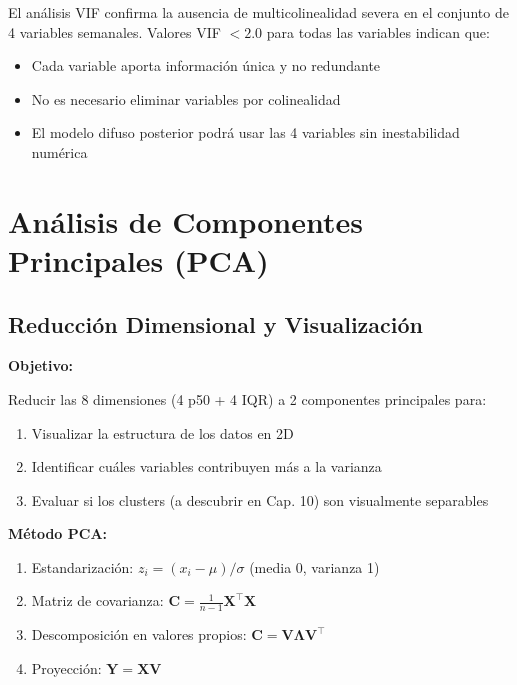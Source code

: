 \documentclass[12pt,letterpaper,twoside]{report}
\newcommand{\mat}[1]{\mathbf{#1}}
\begin{document}
\begin{calculobox}
\begin{conclusionbox}
El análisis VIF confirma la ausencia de multicolinealidad severa en el conjunto de 4 variables semanales. Valores VIF $< 2.0$ para todas las variables indican que:
\begin{itemize}[noitemsep]
    \item Cada variable aporta información única y no redundante
    \item No es necesario eliminar variables por colinealidad
    \item El modelo difuso posterior podrá usar las 4 variables sin inestabilidad numérica
\end{itemize}
\end{conclusionbox}

\section{Análisis de Componentes Principales (PCA)}

\subsection{Reducción Dimensional y Visualización}

\begin{hipotesisbox}
\textbf{Objetivo:}

Reducir las 8 dimensiones (4 p50 + 4 IQR) a 2 componentes principales para:
\begin{enumerate}[noitemsep]
    \item Visualizar la estructura de los datos en 2D
    \item Identificar cuáles variables contribuyen más a la varianza
    \item Evaluar si los clusters (a descubrir en Cap. 10) son visualmente separables
\end{enumerate}
\end{hipotesisbox}

\begin{estadisticobox}
\textbf{Método PCA:}

\begin{enumerate}[noitemsep]
    \item Estandarización: $z_i = (x_i - \mu) / \sigma$ (media 0, varianza 1)
    \item Matriz de covarianza: $\mat{C} = \frac{1}{n-1}\mat{X}^\top\mat{X}$
    \item Descomposición en valores propios: $\mat{C} = \mat{V}\mat{\Lambda}\mat{V}^\top$
    \item Proyección: $\mat{Y} = \mat{X}\mat{V}$
\end{enumerate}


\end{estadisticobox}
\end{calculobox}
\end{document}
